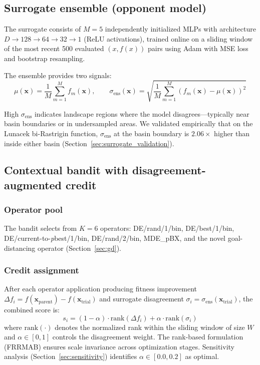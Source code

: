 \documentclass[preprint,12pt,number]{elsarticle}
\newcommand{\sigmaens}{\sigma_{\text{ens}}}
\begin{document}
\subsection{Surrogate ensemble (opponent model)}
\label{sec:surrogate}

The surrogate consists of $M = 5$ independently initialized MLPs with architecture $D \to 128 \to 64 \to 32 \to 1$ (ReLU activations), trained online on a sliding window of the most recent 500 evaluated $(x, f(x))$ pairs using Adam with MSE loss and bootstrap resampling.

The ensemble provides two signals:
\begin{equation}
\mu(\mathbf{x}) = \frac{1}{M} \sum_{m=1}^{M} f_m(\mathbf{x}), \qquad
\sigmaens(\mathbf{x}) = \sqrt{\frac{1}{M} \sum_{m=1}^{M} \left(f_m(\mathbf{x}) - \mu(\mathbf{x})\right)^2}
\label{eq:ensemble}
\end{equation}

High $\sigmaens$ indicates landscape regions where the model disagrees---typically near basin boundaries or in undersampled areas. We validated empirically that on the Lunacek bi-Rastrigin function, $\sigmaens$ at the basin boundary is $2.06\times$ higher than inside either basin (Section~\ref{sec:surrogate_validation}).

\subsection{Contextual bandit with disagreement-augmented credit}
\label{sec:bandit}

\subsubsection{Operator pool}

The bandit selects from $K = 6$ operators: DE/rand/1/bin, DE/best/1/bin, DE/current-to-\emph{p}best/1/bin, DE/rand/2/bin, MDE\_pBX, and the novel goal-distancing operator (Section~\ref{sec:gd}).

\subsubsection{Credit assignment}

After each operator application producing fitness improvement $\Delta f_i = f(\mathbf{x}_{\text{parent}}) - f(\mathbf{x}_{\text{trial}})$ and surrogate disagreement $\sigma_i = \sigmaens(\mathbf{x}_{\text{trial}})$, the combined score is:
\begin{equation}
s_i = (1 - \alpha) \cdot \text{rank}(\Delta f_i) + \alpha \cdot \text{rank}(\sigma_i)
\label{eq:credit}
\end{equation}
where $\text{rank}(\cdot)$ denotes the normalized rank within the sliding window of size $W$ and $\alpha \in [0, 1]$ controls the disagreement weight. The rank-based formulation (FRRMAB) ensures scale invariance across optimization stages. Sensitivity analysis (Section~\ref{sec:sensitivity}) identifies $\alpha \in [0.0, 0.2]$ as optimal.
\end{document}
